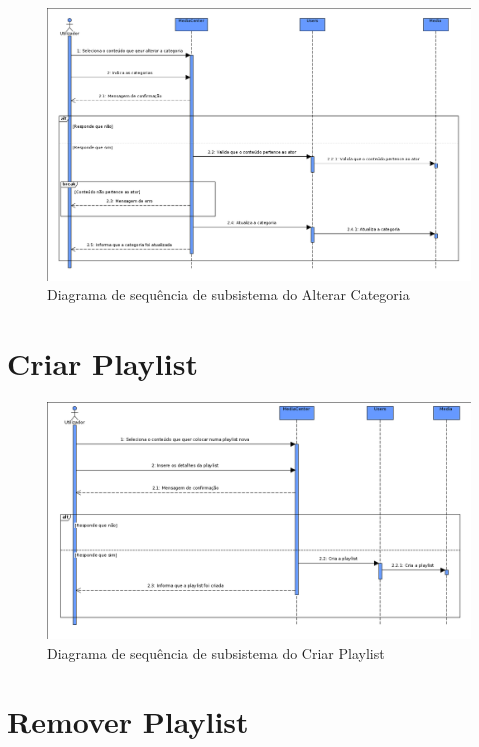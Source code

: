 \documentclass[a4paper]{report}
\begin{document}
\begin{figure}[H]
	\centering 
    \includegraphics[width=\textwidth]{images/altcategoriaSub.png}  
    \caption{Diagrama de sequência de subsistema do Alterar Categoria}
\end{figure}

\section{Criar Playlist}

\begin{figure}[H]
	\centering 
    \includegraphics[width=\textwidth]{images/criarplaylistSub.png}  
    \caption{Diagrama de sequência de subsistema do Criar Playlist}
\end{figure}

\section{Remover Playlist}
\end{document}
